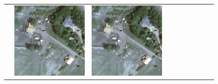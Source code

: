 \begin{figure}[H]
\begin{tabularx}{\textwidth}{c|*{9}{X}}
    & \includegraphics[trim={730pt 220pt 200pt 720pt},clip,width=\linewidth]{images/015Results/02perm_exp/comp_images/rgb/523.png}
    & \includegraphics[trim={850pt 110pt 80pt 830pt},clip,width=\linewidth]{images/015Results/02perm_exp/comp_images/rgb/523.png}

\end{tabularx}
\end{figure}
